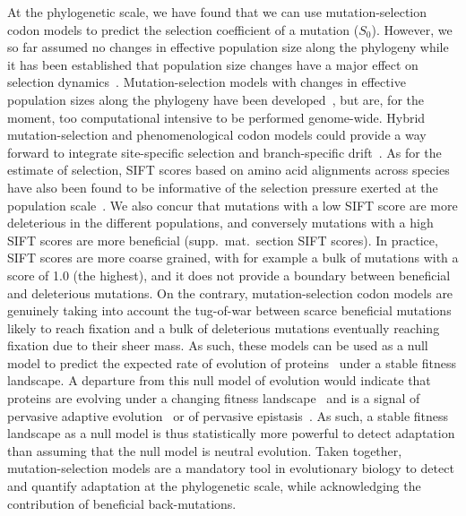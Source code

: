 \documentclass{article}
\newcommand{\Sphy}{S_{0}}
\begin{document}
    At the phylogenetic scale, we have found that we can use mutation-selection codon models to predict the selection coefficient of a mutation ($\Sphy$).
    However, we so far assumed no changes in effective population size along the phylogeny while it has been established that population size changes have a major effect on selection dynamics~\cite{lanfear_population_2014, jones_shifting_2017, platt_protein_2018}.
    Mutation-selection models with changes in effective population sizes along the phylogeny have been developed~\cite{latrille_inferring_2021}, but are, for the moment, too computational intensive to be performed genome-wide.
    Hybrid mutation-selection and phenomenological codon models could provide a way forward to integrate site-specific selection and branch-specific drift~\cite{brevet_reconstructing_2021a}.
    As for the estimate of selection, SIFT scores based on amino acid alignments across species have also been found to be informative of the selection pressure exerted at the population scale~\cite{chen_hunting_2021}.
    We also concur that mutations with a low SIFT score are more deleterious in the different populations, and conversely mutations with a high SIFT scores are more beneficial (supp.\ mat.\  section SIFT scores).
    In practice, SIFT scores are more coarse grained, with for example a bulk of mutations with a score of 1.0 (the highest), and it does not provide a boundary between beneficial and deleterious mutations.
    On the contrary, mutation-selection codon models are genuinely taking into account the tug-of-war between scarce beneficial mutations likely to reach fixation and a bulk of deleterious mutations eventually reaching fixation due to their sheer mass.
    As such, these models can be used as a null model to predict the expected rate of evolution of proteins~\cite{spielman_relationship_2015, dosreis_how_2015} under a stable fitness landscape.
    A departure from this null model of evolution would indicate that proteins are evolving under a changing fitness landscape~\cite{cvijovic_fate_2015, rodrigue_detecting_2017, tamuri_mutationselection_2021} and is a signal of pervasive adaptive evolution~\cite{rodrigue_bayesian_2021} or of pervasive epistasis~\cite{rodrigue_detecting_2017}.
    As such, a stable fitness landscape as a null model is thus statistically more powerful to detect adaptation than assuming that the null model is neutral evolution.
    Taken together, mutation-selection models are a mandatory tool in evolutionary biology to detect and quantify adaptation at the phylogenetic scale, while acknowledging the contribution of beneficial back-mutations.
\end{document}
